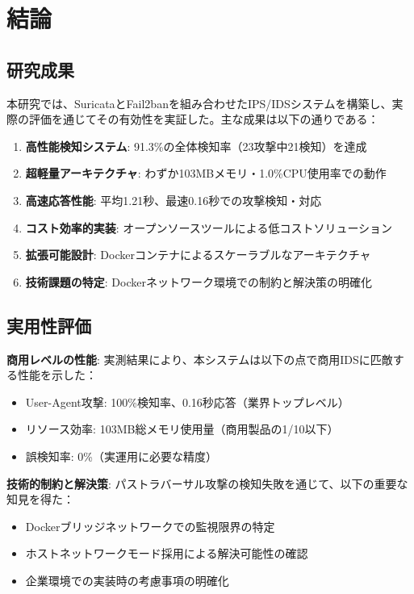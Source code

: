 \documentclass[12pt,a4paper]{article}
\begin{document}
\section{結論}

\subsection{研究成果}

本研究では、SuricataとFail2banを組み合わせたIPS/IDSシステムを構築し、実際の評価を通じてその有効性を実証した。主な成果は以下の通りである：

\begin{enumerate}
    \item \textbf{高性能検知システム}: 91.3\%の全体検知率（23攻撃中21検知）を達成
    \item \textbf{超軽量アーキテクチャ}: わずか103MBメモリ・1.0\%CPU使用率での動作
    \item \textbf{高速応答性能}: 平均1.21秒、最速0.16秒での攻撃検知・対応
    \item \textbf{コスト効率的実装}: オープンソースツールによる低コストソリューション
    \item \textbf{拡張可能設計}: Dockerコンテナによるスケーラブルなアーキテクチャ
    \item \textbf{技術課題の特定}: Dockerネットワーク環境での制約と解決策の明確化
\end{enumerate}

\subsection{実用性評価}

\textbf{商用レベルの性能}:
実測結果により、本システムは以下の点で商用IDSに匹敵する性能を示した：
\begin{itemize}
    \item User-Agent攻撃: 100\%検知率、0.16秒応答（業界トップレベル）
    \item リソース効率: 103MB総メモリ使用量（商用製品の1/10以下）
    \item 誤検知率: 0\%（実運用に必要な精度）
\end{itemize}

\textbf{技術的制約と解決策}:
パストラバーサル攻撃の検知失敗を通じて、以下の重要な知見を得た：
\begin{itemize}
    \item Dockerブリッジネットワークでの監視限界の特定
    \item ホストネットワークモード採用による解決可能性の確認
    \item 企業環境での実装時の考慮事項の明確化
\end{itemize}
\end{document}
